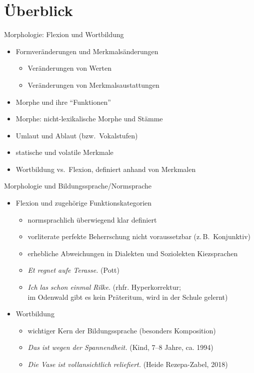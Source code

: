 \section{Überblick}

\begin{frame}
  {Morphologie: Flexion und Wortbildung}
  \pause
  \begin{itemize}[<+->]
    \item \alert{Formveränderungen} und \alert{Merkmalsänderungen}
      \begin{itemize}[<+->]
        \item Veränderungen von Werten
        \item Veränderungen von Merkmalsaustattungen
      \end{itemize}
      \Halbzeile
    \item Morphe und ihre "`Funktionen"'
    \item Morphe: nicht-lexikalische Morphe und Stämme
    \item Umlaut und Ablaut (bzw.\ Vokalstufen)
    \item statische und volatile Merkmale
    \item Wortbildung vs.\ Flexion, definiert anhand von Merkmalen
  \end{itemize}
\end{frame}

\begin{frame}
  {Morphologie und Bildungssprache\slash Normsprache}
  \pause
  \begin{itemize}[<+->]
    \item Flexion und zugehörige Funktionskategorien
      \begin{itemize}[<+->]
        \item normsprachlich überwiegend \alert{klar definiert}
        \item vorliterate perfekte Beherrschung nicht voraussetzbar (z.\,B.\ Konjunktiv)
          \Halbzeile
        \item erhebliche Abweichungen in \alert{Dialekten} und \alert{Soziolekten} \alert{Kiezsprachen}
        \item \textit{Et regnet aufe Terasse.} (Pott)
        \item \textit{Ich las schon einmal Rilke.} (rhfr. Hyperkorrektur;\\
          im Odenwald gibt es kein Präteritum, wird in der Schule gelernt)
      \end{itemize}
     \Halbzeile 
    \item Wortbildung
      \begin{itemize}[<+->]
        \item wichtiger Kern der Bildungssprache (besonders Komposition)
          \Halbzeile
        \item \textit{Das ist wegen der Spannendheit.} (Kind, 7--8 Jahre, ca. 1994)
        \item \textit{Die Vase ist vollansichtlich reliefiert.} (Heide Rezepa-Zabel, 2018)
      \end{itemize}
  \end{itemize}
\end{frame}

